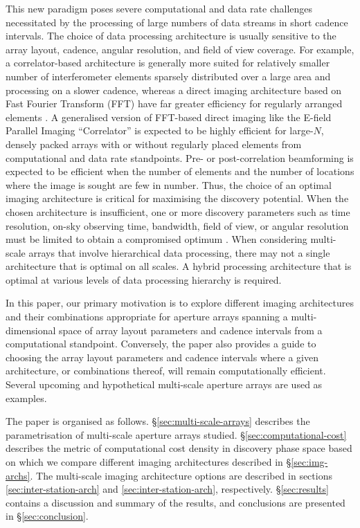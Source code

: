 \documentclass[
  journal=pasa,
  manuscript=article-type,
  year=2020,
  volume=37,
]{cup-journal}
\begin{document}
This new paradigm poses severe computational and data rate challenges necessitated by the processing of large numbers of data streams in short cadence intervals. The choice of data processing architecture is usually sensitive to the array layout, cadence, angular resolution, and field of view coverage. For example, a correlator-based architecture is generally more suited for relatively smaller number of interferometer elements sparsely distributed over a large area and processing on a slower cadence, whereas a direct imaging architecture based on Fast Fourier Transform (FFT) have far greater efficiency for regularly arranged elements \citep{Daishido+1991,Otobe+1994,Tegmark+2009,Tegmark+2010,Foster+2014,Masui+2019}. A generalised version of FFT-based direct imaging like the E-field Parallel Imaging ``Correlator'' \citep[EPIC;][]{Thyagarajan+2017,Thyagarajan+2019,Krishnan+2023} is expected to be highly efficient for large-$N$, densely packed arrays with or without regularly placed elements from computational and data rate standpoints. Pre- or post-correlation beamforming is expected to be efficient when the number of elements and the number of locations where the image is sought are few in number. Thus, the choice of an optimal imaging architecture is critical for maximising the discovery potential. When the chosen architecture is insufficient, one or more discovery parameters such as time resolution, on-sky observing time, bandwidth, field of view, or angular resolution must be limited to obtain a compromised optimum \citep[for example,][]{Price2024}. When considering multi-scale arrays that involve hierarchical data processing, there may not a single architecture that is optimal on all scales. A hybrid processing architecture that is optimal at various levels of data processing hierarchy is required. 

In this paper, our primary motivation is to explore different imaging architectures and their combinations appropriate for aperture arrays spanning a multi-dimensional space of array layout parameters and cadence intervals from a computational standpoint. Conversely, the paper also provides a guide to choosing the array layout parameters and cadence intervals where a given architecture, or combinations thereof, will remain computationally efficient. Several upcoming and hypothetical multi-scale aperture arrays are used as examples. 

The paper is organised as follows.
\S\ref{sec:multi-scale-arrays} describes the parametrisation of multi-scale aperture arrays studied. \S\ref{sec:computational-cost} describes the metric of computational cost density in discovery phase space based on which we compare different imaging architectures described in \S\ref{sec:img-archs}. The multi-scale imaging architecture options are described in sections \ref{sec:inter-station-arch} and \ref{sec:inter-station-arch}, respectively. \S\ref{sec:results} contains a discussion and summary of the results, and conclusions are presented in \S\ref{sec:conclusion}. 
\end{document}
